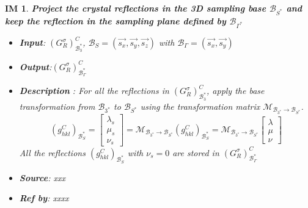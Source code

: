 \documentclass[12pt]{article}
\newtheorem{IM}{IM}
\begin{document}
\begin{IM}
\label{IM_2}
\noindent\colorbox{shadecolorIM}{\normalfont \textbf{Project the crystal reflections in the 3D sampling base $\mathcal{B}_{{S}^{*}}$ and keep the reflection in the sampling plane defined by  $\mathcal{B}_{{\Gamma}^{*}}$}}
\normalfont
\begin{itemize}
\item \textbf{Input}: $(G^{\sigma}_{R})^{C}_{\mathcal{B}_{3}^{*}}$,  $\mathcal{B}_{S}=(\vec{s_x}, \vec{s_y}, \vec{s_z})$ with $\mathcal{B}_{\Gamma}=(\vec{s_x}, \vec{s_y})$
\item \textbf{Output}:$(G^{\sigma}_{R})^{C}_{\mathcal{B}_{\Gamma}^{*}}$
\item \textbf{Description} : For all the reflections in $(G^{\sigma}_{R})^{C}_{\mathcal{B}_{3}^{*}}$, apply the base transformation from $\mathcal{B}_{{3}^{*}}$ to $\mathcal{B}_{{S}^{*}}$ using the transformation matrix $\mathcal{M}_{\mathcal{B}_{{3}^{*}}\rightarrow \mathcal{B}_{{S}^{*}}}$. 
\begin{equation}
(g_{hkl}^{C})_{\mathcal{B}_{S}^{*}} = \begin{bmatrix}
\lambda_s \\
\mu_s \\
\nu_s 
\end{bmatrix} =  \mathcal{M}_{\mathcal{B}_{{3}^{*}}\rightarrow \mathcal{B}_{{S}^{*}}} 
(g_{hkl}^{C})_{\mathcal{B}_{S}^{*}} =  \mathcal{M}_{\mathcal{B}_{{3}^{*}}\rightarrow \mathcal{B}_{{S}^{*}}} \begin{bmatrix}
\lambda \\
\mu \\
\nu 
\end{bmatrix}
\end{equation}
All the reflections $(g_{hkl}^{C})_{\mathcal{B}_{S}^{*}}$ with $\nu_s=0$ are stored in  $(G^{\sigma}_{R})^{C}_{\mathcal{B}_{\Gamma}^{*}}$
\item \textbf{Source}: xxx
\item \textbf{Ref by}: xxxx
\end{itemize}
\end{IM}
\end{document}
